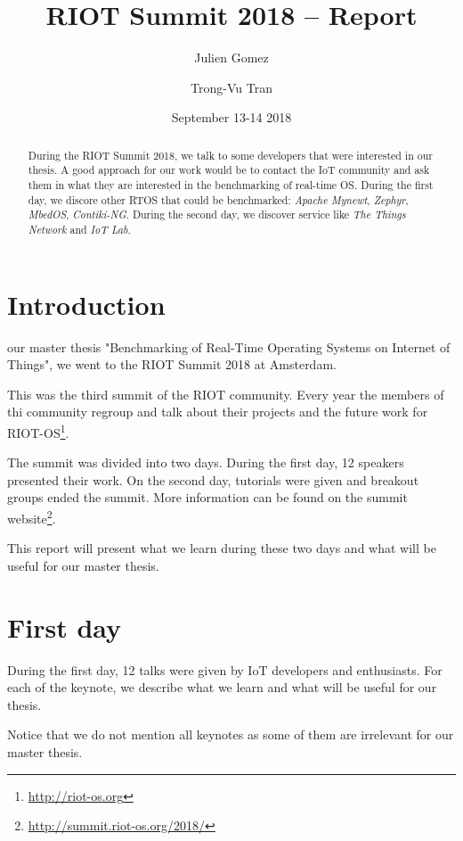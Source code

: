 \documentclass[journal, a4paper]{../IEEEtran}
\begin{document}
\title{RIOT Summit 2018 -- Report}
\author{Julien Gomez \and Trong-Vu Tran}
\date{September 13-14 2018}
\maketitle

\begin{abstract}
	During the RIOT Summit 2018, we talk to some developers that were
	interested in our thesis. A good approach for our work would be to
	contact the IoT community and ask them in what they are interested in
    the benchmarking of real-time OS. During the first day, we discore other 
    RTOS that could be benchmarked: \textit{Apache Mynewt}, \textit{Zephyr}, 
    \textit{MbedOS}, \textit{Contiki-NG}. During the second day, we discover 
    service like \textit{The Things Network} and \textit{IoT Lab}.
\end{abstract}

\section{Introduction}
 our master thesis "Benchmarking of Real-Time Operating 
Systems on Internet of Things", we went to the RIOT Summit 2018 at Amsterdam.
    
This was the third summit of the RIOT community. Every year the members of
thi community regroup and talk about their projects and the future work for
RIOT-OS\footnote{\url{http://riot-os.org}}.

The summit was divided into two days. During the first day, 12 speakers
presented their work. On the second day, tutorials were given and breakout
groups ended the summit. More information can be found on the summit 
website\footnote{\url{http://summit.riot-os.org/2018/}}.

This report will present what we learn during these two days and what will
be useful for our master thesis.

\section{First day}
During the first day, 12 talks were given by IoT developers and enthusiasts.
For each of the keynote, we describe what we learn and what will be useful for
our thesis.

Notice that we do not mention all keynotes as some of them are irrelevant for
our master thesis.
\end{document}
